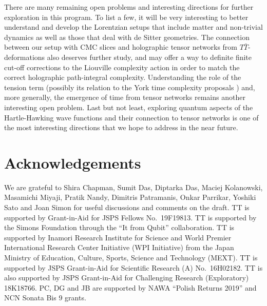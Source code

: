 \documentclass[a4paper,12pt]{article}
\begin{document}
There are many remaining open problems and interesting directions for further exploration in this program. To list a few, it will be very interesting to better understand and develop the Lorentzian setups that include matter and non-trivial dynamics as well as those that deal with de Sitter geometries. The connection between our setup with CMC slices and holographic tensor networks from $T\bar{T}$-deformations \cite{Caputa:2020fbc} also deserves further study, and may offer a way to definite finite cut-off corrections to the Liouville complexity action in order to match the correct holographic  path-integral complexity. Understanding the role of the tension term (possibly its relation to the York time complexity proposals \cite{York:1972sj,Belin:2018bpg}) and, more generally, the emergence of time from tensor networks remains another interesting open problem. Last but not least, exploring quantum aspects of the Hartle-Hawking wave functions and their connection to tensor networks is one of the most interesting directions that we hope to address in the near future.
 
\section*{ Acknowledgements } 
We are grateful to Shira Chapman, Sumit Das, Diptarka Das, Maciej Kolanowski, Masamichi Miyaji, Pratik Nandy, Dimitris Patramanis, Onkar Parrikar, Yoshiki Sato and Joan Simon for useful discussions and comments on the draft. TT is supported by Grant-in-Aid for JSPS Fellows No.~19F19813.
TT is supported by the Simons Foundation through the ``It from Qubit'' collaboration.  
TT is supported by Inamori Research Institute for Science and 
World Premier International Research Center Initiative (WPI Initiative) 
from the Japan Ministry of Education, Culture, Sports, Science and Technology (MEXT). 
TT is supported by JSPS Grant-in-Aid for Scientific Research (A) No.~16H02182. 
TT is also supported by JSPS Grant-in-Aid for Challenging Research (Exploratory) 18K18766. PC, DG and JB are supported by NAWA “Polish Returns 2019” and NCN Sonata Bis 9 grants.
\end{document}
